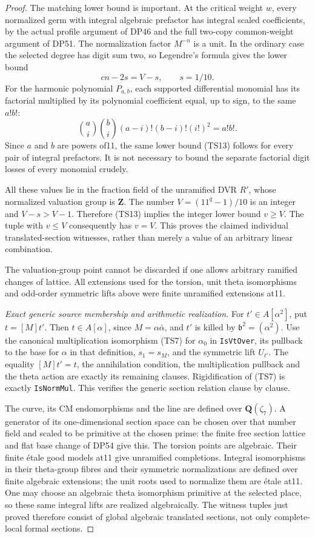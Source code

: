 \documentclass[11pt,a4paper]{article}
\theoremstyle{definition}\newtheorem{remark}[theorem]{Remark}
\begin{document}
\begin{proof}
The matching lower bound is important. At the critical weight \(w\), every normalized germ with integral algebraic prefactor has integral scaled coefficients, by the actual profile argument of DP46 and the full two-copy common-weight argument of DP51. The normalization factor \(M^{-n}\) is a unit. In the ordinary case the selected degree has digit sum two, so Legendre's formula gives the lower bound \[
 cn-2s=V-s,\qquad s=1/10.
 \tag{TS13}
\] For the harmonic polynomial \(P_{a,b}\), each supported differential monomial has its factorial multiplied by its polynomial coefficient equal, up to sign, to the same \(a!b!\): \[
 \binom ai\binom bi(a-i)!(b-i)!(i!)^2=a!b!.
\] Since \(a\) and \(b\) are powers of11, the same lower bound (TS13) follows for every pair of integral prefactors. It is not necessary to bound the separate factorial digit losses of every monomial crudely.

All these values lie in the fraction field of the unramified DVR \(R'\), whose normalized valuation group is \(\mathbf Z\). The number \(V=(11^q-1)/10\) is an integer and \(V-s>V-1\). Therefore (TS13) implies the integer lower bound \(v\ge V\). The tuple with \(v\le V\) consequently has \(v=V\). This proves the claimed individual translated-section witnesses, rather than merely a value of an arbitrary linear combination.

The valuation-group point cannot be discarded if one allows arbitrary ramified changes of lattice. All extensions used for the torsion, unit theta isomorphisms and odd-order symmetric lifts above were finite unramified extensions at11.

\emph{Exact generic source membership and arithmetic realization.}
For \(t'\in A[\alpha^2]\), put \(t=[M]t'\). Then \(t\in A[\alpha]\), since \(M=\alpha\bar\alpha\), and \(t'\) is killed by \(\mathfrak b^2=(\alpha^2)\). Use the canonical multiplication isomorphism (TS7) for \(\alpha_0\) in \texttt{IsVtOver}, its pullback to the base for \(\alpha\) in that definition, \(s_1=s_M\), and the symmetric lift \(U_{t'}\). The equality \([M]t'=t\), the annihilation condition, the multiplication pullback and the theta action are exactly its remaining clauses. Rigidification of (TS7) is exactly \texttt{IsNormMul}. This verifies the generic section relation clause by clause.

The curve, its CM endomorphisms and the line are defined over \(\mathbf Q(\zeta_7)\). A generator of its one-dimensional section space can be chosen over that number field and scaled to be primitive at the chosen prime: the finite free section lattice and flat base change of DP54 give this. The torsion points are algebraic. Their finite étale good models at11 give unramified completions. Integral isomorphisms in their theta-group fibres and their symmetric normalizations are defined over finite algebraic extensions; the unit roots used to normalize them are étale at11. One may choose an algebraic theta isomorphism primitive at the selected place, so these same integral lifts are realized algebraically. The witness tuples just proved therefore consist of global algebraic translated sections, not only complete-local formal sections.


\end{proof}
\end{document}
